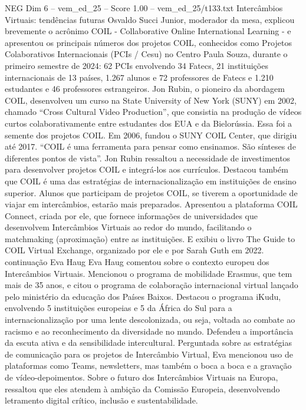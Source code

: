 \begin{textsample}{NEG Dim 6 – vem\_ed\_25 – Score 1.00 – vem\_ed\_25/t133.txt}  \label{ex:f6_neg_064}
Intercâmbios Virtuais: tendências futuras Osvaldo Succi Junior, moderador da mesa, explicou brevemente o acrônimo COIL - Collaborative Online International Learning - e apresentou os principais números dos projetos COIL, conhecidos como Projetos Colaborativos Internacionais (PCIs / Cesu) no Centro Paula Souza, durante o primeiro semestre de 2024: 62 PCIs envolvendo 34 Fatecs, 21 instituições internacionais de 13 países, 1.267 alunos e 72 professores de Fatecs e 1.210 estudantes e 46 professores estrangeiros.
Jon Rubin, o pioneiro da abordagem COIL, desenvolveu um curso na State University of New York (SUNY) em 2002, chamado “Cross Cultural Video Production”, que consistia na produção de vídeos curtos colaborativamente entre estudantes dos EUA e da Bielorússia.
Essa foi a semente dos projetos COIL.
Em 2006, fundou o SUNY COIL Center, que dirigiu até 2017. “COIL é uma ferramenta para pensar como ensinamos.
São sínteses de diferentes pontos de vista”.
Jon Rubin ressaltou a necessidade de investimentos para desenvolver projetos COIL e integrá-los aos currículos.
Destacou também que COIL é uma das estratégias de internacionalização em instituições de ensino superior.
Alunos que participam de projetos COIL, se tiverem a oportunidade de viajar em intercâmbios, estarão mais preparados.
Apresentou a plataforma COIL Connect, criada por ele, que fornece informações de universidades que desenvolvem Intercâmbios Virtuais ao redor do mundo, facilitando o matchmaking (aproximação) entre as instituições.
E exibiu o livro The Guide to COIL Virtual Exchange, organizado por ele e por Sarah Guth em 2022. continuação Eva Haug Eva Haug comentou sobre o contexto europeu dos Intercâmbios Virtuais.
Mencionou o programa de mobilidade Erasmus, que tem mais de 35 anos, e citou o programa de colaboração internacional virtual lançado pelo ministério da educação dos Países Baixos.
Destacou o programa iKudu, envolvendo 5 instituições europeias e 5 da África do Sul para a internacionalização por uma lente descolonizada, ou seja, voltada ao combate ao racismo e ao reconhecimento da diversidade no mundo.
Defendeu a importância da escuta ativa e da sensibilidade intercultural.
Perguntada sobre as estratégias de comunicação para os projetos de Intercâmbio Virtual, Eva mencionou uso de plataformas como Teams, newsletters, mas também o boca a boca e a gravação de vídeo-depoimentos.
Sobre o futuro dos Intercâmbios Virtuais na Europa, ressaltou que eles atendem à ambição da Comissão Europeia, desenvolvendo letramento digital crítico, inclusão e sustentabilidade.

\end{textsample}
